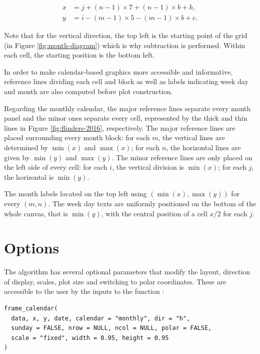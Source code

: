 \begin{equation}
  \begin{aligned}
  x &= j + (n - 1) \times 7 + (n - 1) \times b + h, \\
  y &= i - (m - 1) \times 5 - (m - 1) \times b + c. \label{eq:final}
  \end{aligned}
\end{equation}

Note that for the vertical direction, the top left is the starting point
of the grid (in Figure \ref{fig:month-diagram}) which is why subtraction
is performed. Within each cell, the starting position is the bottom
left.

In order to make calendar-based graphics more accessible and
informative, reference lines dividing each cell and block as well as
labels indicating week day and month are also computed before plot
construction.

Regarding the monthly calendar, the major reference lines separate every
month panel and the minor ones separate every cell, represented by the
thick and thin lines in Figure \ref{fig:flinders-2016}, respectively.
The major reference lines are placed surrounding every month block: for
each \(m\), the vertical lines are determined by \(\min{(x)}\) and
\(\max{(x)}\); for each \(n\), the horizontal lines are given by
\(\min{(y)}\) and \(\max{(y)}\). The minor reference lines are only
placed on the left side of every cell: for each \(i\), the vertical
division is \(\min{(x)}\); for each \(j\), the horizontal is
\(\min{(y)}\).

The month labels located on the top left using
\((\min{(x)}, \max{(y)})\) for every \((m, n)\). The week day texts are
uniformly positioned on the bottom of the whole canvas, that is
\(\min{(y)}\), with the central position of a cell \(x / 2\) for each
\(j\).

\hypertarget{options}{%
\section{Options}\label{options}}

\label{sec:opt}

The algorithm has several optional parameters that modify the layout,
direction of display, scales, plot size and switching to polar
coordinates. These are accessible to the user by the inputs to the
function :

\begin{verbatim}
frame_calendar(
  data, x, y, date, calendar = "monthly", dir = "h", 
  sunday = FALSE, nrow = NULL, ncol = NULL, polar = FALSE, 
  scale = "fixed", width = 0.95, height = 0.95
)
\end{verbatim}

